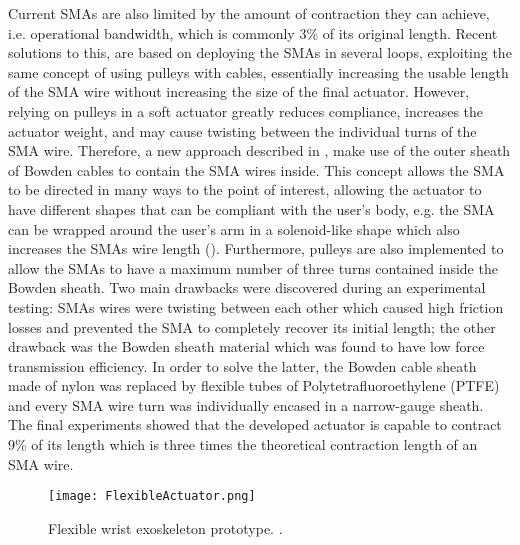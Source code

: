 Current SMAs are also limited by the amount of contraction they can achieve, i.e. operational bandwidth, which is commonly 3\% of its original length. Recent solutions to this, are based on deploying the SMAs in several loops, exploiting the same concept of using pulleys with cables, essentially increasing the usable length of the SMA wire without increasing the size of the final actuator. However, relying on pulleys in a soft actuator greatly reduces compliance, increases the actuator weight, and may cause twisting between the individual turns of the SMA wire. Therefore, a new approach described in \cite{Villoslada2015}, make use of the outer sheath of Bowden cables to contain the SMA wires inside. This concept allows the SMA to be directed in many ways to the point of interest, allowing the actuator to have different shapes that can be compliant with the user's body, e.g. the SMA can be wrapped around the user's arm in a solenoid-like shape which also increases the SMAs wire length (). Furthermore, pulleys are also implemented to allow the SMAs to have a maximum number of three turns contained inside the Bowden sheath. Two main drawbacks were discovered during an experimental testing: SMAs wires were twisting between each other which caused high friction losses and prevented the SMA to completely recover its initial length; the other drawback was the Bowden sheath material which was found to have low force transmission efficiency. In order to solve the latter, the Bowden cable sheath made of nylon was replaced by flexible tubes of Polytetrafluoroethylene (PTFE) and every SMA wire turn was individually encased in a narrow-gauge sheath. The final experiments showed that the developed actuator is capable to contract 9\% of its length which is three times the theoretical contraction length of an SMA wire.

\begin{figure}[hbtp!]
    \centering
    \texttt{[image: FlexibleActuator.png]}
    \caption[Flexible wrist exoskeleton prototype.]{Flexible wrist exoskeleton prototype. \cite{Villoslada2015}. }
    \label{fig:flexible_actuator}
\end{figure}

